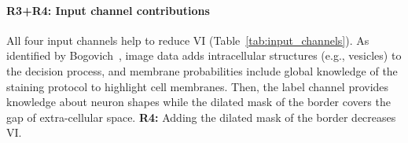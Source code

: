\documentclass[10pt,twocolumn,letterpaper]{article}
\newcommand{\JT}[1]{\textcolor{red}{[JT: #1]}}
\begin{document}
\paragraph{R3+R4: Input channel contributions} All four input channels help to reduce VI (Table~\ref{tab:input_channels}). As identified by Bogovich~\etal, image data adds intracellular structures (e.g., vesicles) to the decision process, and membrane probabilities include global knowledge of the staining protocol to highlight cell membranes. Then, the label channel provides knowledge about neuron shapes while the dilated mask of the border covers the gap of extra-cellular space. \newline \noindent \textbf{R4:} Adding the dilated mask of the border decreases VI. %

\begin{table}[h]
\caption{Automatic selection on the AC4 subvolume ($p_t=0.95$) using our GP classifier; median VI reduction. The combination of all four input channels performs best.\vspace{-0.25cm}}
\vspace{-0.5cm}
\label{tab:input_channels}
\end{table}

\end{document}

